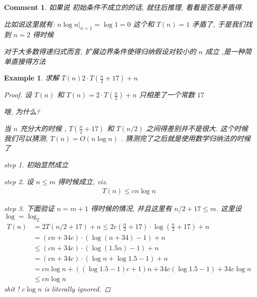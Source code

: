 \documentclass[a4paper, 10pt]{ctexart} %
\newtheorem{example}{Example}
\newtheorem{corollary}{Comment}
\begin{document}
\begin{corollary}
    如果说 初始条件不成立的的话, 
    就往后推理, 看看是否是矛盾得. 

    比如说这里就有: $ \left. n \log n\right|_{n =1}  = \log 1  = 0 $ 这个和 
    $T \left(n\right)  = 1$ 矛盾了, 于是我们找到 $ n = 2$ 得时候 

    对于大多数得递归式而言, 扩展边界条件使得归纳假设对较小的 $n$ 成立 ,是一种简单直接得方法
\end{corollary}
\begin{example}
    求解 $T \left(n \right)  2 \cdot  T \left( \frac{n}{2}  + 17\right) + n$ 
    \begin{proof}
        设 $T \left(n\right) $ 和 $ T \left(n\right)  = 2 \cdot  T \left( \frac{n}{2} \right) + n$ 只相差了一个常数 $17$ 
        
        啥, 为什么? 

        当 $n$ 充分大的时候 ,  $T \left( \frac{n}{2} + 17    \right) $ 和 $T\left(n / 2\right) $ 之间得差别并不是很大. 
        这个时候 我们可以猜测, $T \left(n\right)  = O \left(n \log n    \right)$ . 猜测完了之后就是使用数学归纳法的时候了
        
        step 1. 初始显然成立

        step 2. 设 $ n \le m$ 得时候成立, viz. 
        \begin{align*}
            T \left(n\right) \le cn \log n
        \end{align*}

        step 3. 下面验证  $n  =  m  +1$ 得时候的情况, 并且这里有 $ n / 2 + 17 \le m$. 这里设 $\log = \log _{2}$
        \begin{align*}
            T \left(n \right) & = 2 T \left(  n  / 2 + 17\right) + n \le 2 c \left( \frac{n}{2}  + 17    \right) \cdot  \log  \left( \frac{n}{2} + 17   \right) + n\\
            & = \left(c n + 34 c\right) \cdot \left( \log  \left( n + 34\right)  - 1\right) + n \\
            & \le \left(c n  +34 c\right)  \cdot  \left( \log  \left( 1.5 n\right)  -1 \right) + n   \tag{$n + 34 < 1.5$} \\
            & =  \left(c n + 34 c\right)  \cdot  \left( \log  n + \log 1.5  -1  \right) + n\\
            & = cn \log  n + \left(  \left(\log 1.5  - 1\right)c + 1 \right)  n + 34 c \left( \log  1.5  -1\right)  + 34 c \log n \\
            & \le c n \log n \tag{$(\log 1.5 - 1) c + 1 \le 0, \log  1.5 - 1 < 0$}
        \end{align*}
        shit ! $c \log n$ is literally ignored. 
    \end{proof}
    \end{example}
\end{document}
